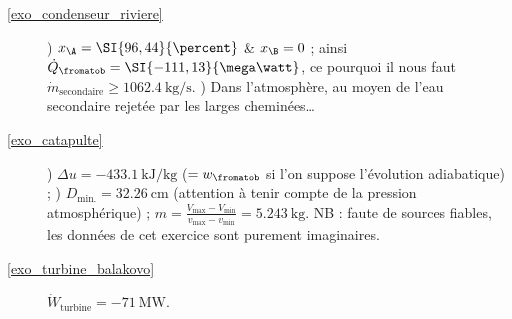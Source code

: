 \begin{description}
	\item [\ref{exo_condenseur_riviere}] 
			) $x_\A = \SI{96,44}{\percent}$ \& $x_\B = 0$ ; ainsi $\dot Q_\fromatob = \SI{-111,13}{\mega\watt}$, ce pourquoi il nous faut $\dot{m}_\text{secondaire} \geq \SI{1062,4}{\kilogram\per\second}$.
			) Dans l’atmosphère, au moyen de l’eau secondaire rejetée par les larges cheminées…
	\item [\ref{exo_catapulte}] 
			) $\Delta u = \SI{-433,1}{\kilo\joule\per\kilogram}$ ($=w_\fromatob$ si l’on suppose l’évolution adiabatique) ;
			) $D_\text{min.} = \SI{32,26}{\centi\metre}$ (attention à tenir compte de la pression atmosphérique) ; $m = \frac{V_\text{max} - V_\text{min}}{v_\text{max} - v_\text{min}} = \SI{5,243}{\kilogram}$.
			\tab NB : faute de sources fiables, les données de cet exercice sont purement imaginaires.
	\item [\ref{exo_turbine_balakovo}] \tab $\dot{W}_\text{turbine} = \SI{-71}{\mega\watt}$.
\end{description}
